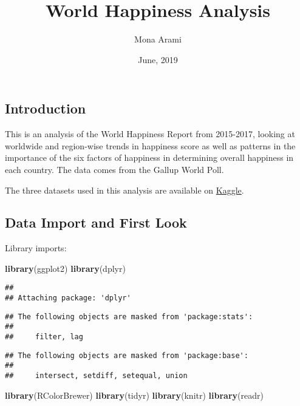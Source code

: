 \documentclass[]{article}
\title{World Happiness Analysis}
\author{Mona Arami}
\date{June, 2019}
\newenvironment{Shaded}{\begin{snugshade}}{\end{snugshade}}
\newcommand{\KeywordTok}[1]{\textcolor[rgb]{0.13,0.29,0.53}{\textbf{#1}}}
\newcommand{\NormalTok}[1]{#1}
\begin{document}
\maketitle

\hypertarget{introduction}{%
\subsection{Introduction}\label{introduction}}

This is an analysis of the World Happiness Report from 2015-2017,
looking at worldwide and region-wise trends in happiness score as well
as patterns in the importance of the six factors of happiness in
determining overall happiness in each country. The data comes from the
Gallup World Poll.

The three datasets used in this analysis are available on
\href{https://www.kaggle.com/unsdsn/world-happiness/data}{Kaggle}.

\hypertarget{data-import-and-first-look}{%
\subsection{Data Import and First
Look}\label{data-import-and-first-look}}

Library imports:

\begin{Shaded}
\begin{Highlighting}[]
\KeywordTok{library}\NormalTok{(ggplot2)}
\KeywordTok{library}\NormalTok{(dplyr)}
\end{Highlighting}
\end{Shaded}

\begin{verbatim}
## 
## Attaching package: 'dplyr'
\end{verbatim}

\begin{verbatim}
## The following objects are masked from 'package:stats':
## 
##     filter, lag
\end{verbatim}

\begin{verbatim}
## The following objects are masked from 'package:base':
## 
##     intersect, setdiff, setequal, union
\end{verbatim}

\begin{Shaded}
\begin{Highlighting}[]
\KeywordTok{library}\NormalTok{(RColorBrewer)}
\KeywordTok{library}\NormalTok{(tidyr)}
\KeywordTok{library}\NormalTok{(knitr)}
\KeywordTok{library}\NormalTok{(readr)}
\end{Highlighting}
\end{Shaded}
\end{document}
